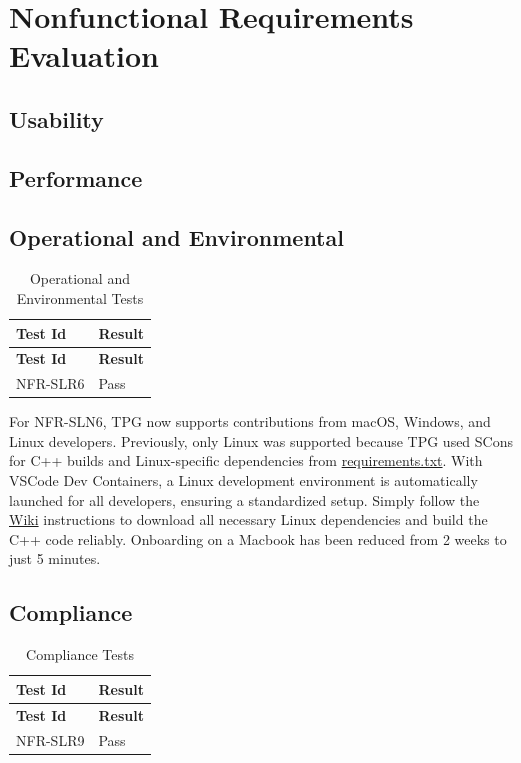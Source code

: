 \documentclass[12pt, titlepage]{article}
\begin{document}
\section{Nonfunctional Requirements Evaluation}

\subsection{Usability}
		
\subsection{Performance}

\subsection{Operational and Environmental}

\begin{center}
  \begin{longtable}{|p{4cm}|p{4cm}|}
  \caption{Operational and Environmental Tests} \\
  \hline
  \textbf{Test Id} & \textbf{Result} \\
  \hline
  \endfirsthead
  \hline
  \textbf{Test Id} & \textbf{Result} \\
  \hline
  \endhead
  NFR-SLR6 & Pass \\
  \hline
  \end{longtable}
\end{center}

For NFR-SLN6, TPG now supports contributions from macOS, Windows, and Linux developers.
Previously, only Linux was supported because TPG used SCons for C++ builds and Linux-specific dependencies from \href{https://gitlab.cas.mcmaster.ca/kellys32/tpg/-/blob/main/requirements.txt}{requirements.txt}.
With VSCode Dev Containers, a Linux development environment is automatically launched for all developers, ensuring a standardized setup.
Simply follow the \href{https://gitlab.cas.mcmaster.ca/kellys32/tpg/-/wikis/home}{Wiki} instructions to download all necessary Linux dependencies and build the C++ code reliably. Onboarding on a Macbook has been reduced from 2 weeks to just 5 minutes.

\subsection{Compliance}

\begin{center}
\begin{longtable}{|p{4cm}|p{4cm}|}
\caption{Compliance Tests} \\
\hline
\textbf{Test Id} & \textbf{Result} \\
\hline
\endfirsthead
\hline
\textbf{Test Id} & \textbf{Result} \\
\hline
\endhead
NFR-SLR9 & Pass \\
\hline
\end{longtable}
\end{center}
\end{document}
